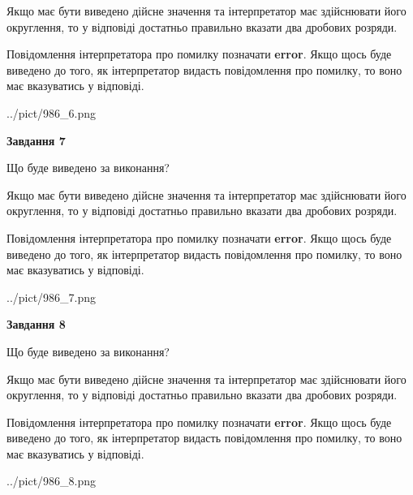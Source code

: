 \documentclass[12pt, ukrainian]{article}
\begin{document}
{\begin {Large}
Якщо має бути виведено дійсне значення та інтерпретатор має здійснювати його округлення, 
то у відповіді достатньо правильно вказати два дробових розряди.

Повідомлення інтерпретатора про помилку позначати \textbf{error}.
Якщо щось буде виведено до того, як інтерпретатор видасть повідомлення про помилку, 
то воно має вказуватись у відповіді. \par

\begin{center}
	{../pict/986_6.png}
\end{center}
\newpage

{\begin {center}\textbf{Завдання 7}\end {center}}\par
Що буде виведено за виконання? \par

Якщо має бути виведено дійсне значення та інтерпретатор має здійснювати його округлення, 
то у відповіді достатньо правильно вказати два дробових розряди.

Повідомлення інтерпретатора про помилку позначати \textbf{error}.
Якщо щось буде виведено до того, як інтерпретатор видасть повідомлення про помилку, 
то воно має вказуватись у відповіді. \par

\begin{center}
	{../pict/986_7.png}
\end{center}
\newpage

{\begin {center}\textbf{Завдання 8}\end {center}}\par
Що буде виведено за виконання? \par

Якщо має бути виведено дійсне значення та інтерпретатор має здійснювати його округлення, 
то у відповіді достатньо правильно вказати два дробових розряди.

Повідомлення інтерпретатора про помилку позначати \textbf{error}.
Якщо щось буде виведено до того, як інтерпретатор видасть повідомлення про помилку, 
то воно має вказуватись у відповіді. \par

\begin{center}
	{../pict/986_8.png}
\end{center}
\newpage


\end{Large}}
\end{document}
